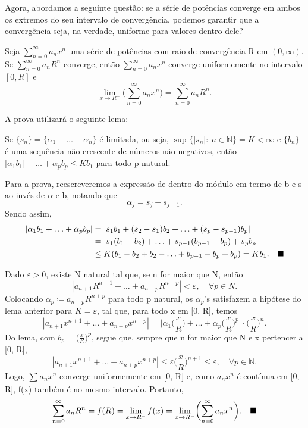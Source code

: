 \documentclass[../analysis_notes.tex]{subfiles}
\begin{document}
Agora, abordamos a seguinte questão: se a série de potências converge em ambos os extremos do seu intervalo de convergência, podemos garantir que a convergência seja, na verdade, uniforme para valores dentro dele?
\hypertarget{abel}{
	\begin{theorem*}[Abel]
		Seja \(\sum\limits_{n=0}^{\infty}a_{n}x^{n}\) uma série de potências com raio de convergência R em \((0, \infty)\). Se \(\sum\limits_{n=0}^{\infty}a_{n}R^{n}\) converge, então \(\sum\limits_{n=0}^{\infty}a_{n}x^{n}\) converge uniformemente no intervalo \([0, R]\) e
		\[
			\lim_{x\to R^{-}}\biggl(\sum\limits_{n=0}^{\infty}a_{n}x^{n}\biggr)=\sum\limits_{n=0}^{\infty}a_{n}R^{n}.
		\]
	\end{theorem*}
}
A prova utilizará o seguinte lema:
\begin{lemma*}
	Se \(\{s_{n}\}=\{\alpha_{1}+\dotsc +\alpha_{n}\}\) é limitada, ou seja, \(\sup_{}\{|s_{n}|: \: n\in \mathbb{N}\}=K<\infty\) e \(\{b_{n}\}\) é uma sequência não-crescente de números não negativos, então \(|\alpha_{1}b_{1}|+\dotsc +\alpha_{p}b_{p}\leq Kb_{1}\) para todo p natural.
\end{lemma*}
\begin{proof*}
	Para a prova, reescreveremos a expressão de dentro do módulo em termo de b e s ao invés de \(\alpha \) e b, notando que
	\[
		\alpha_{j}=s_{j}-s_{j-1}.
	\]
	Sendo assim,
	\begin{align*}
		|\alpha_{1}b_{1}+\dotsc +\alpha_{p}b_{p}| & =|s_{1}b_{1}+(s_{2}-s_{1})b_{2}+\dotsc +(s_{p}-s_{p-1})b_{p}|                        \\
		                                          & =|s_{1}(b_{1}-b_{2})+\dotsc +s_{p-1}(b_{p-1}-b_{p})+s_{p}b_{p}|                      \\
		                                          & \leq K(b_{1}-b_{2}+b_{2}-\dotsc +b_{p-1}-b_{p}+b_{p})=Kb_{1}.\quad \text{$\blacksquare$}
	\end{align*}
\end{proof*}
\begin{proof*}
	Dado \(\varepsilon >0\), existe N natural tal que, se n for maior que N, então
	\[
		|a_{n+1}R^{n+1}+\dotsc +a_{n+p}R^{n+p}|<\varepsilon ,\quad \forall p\in N.
	\]
	Colocando \(\alpha_{p}\coloneqq a_{n+p}R^{n+p}\) para todo p natural, os \(\alpha_{p}\)'s satisfazem a hipótese do lema anterior para \(K=\varepsilon \), tal que, para todo x em [0, R], temos
	\[
		|a_{n+1}x^{n+1}+\dotsc +a_{n+p}x^{n+p}| = \biggl\vert \alpha_{1}\biggl(\frac{x}{R}\biggr)+\dotsc +\alpha_{p}\biggl(\frac{x}{R}\biggr)^{p} \biggr\vert \cdot \biggl(\frac{x}{R}\biggr)^{n}.
	\]
	Do lema, com \(b_{p}=\bigl(\frac{x}{R}\bigr)^{p}\), segue que, sempre que n for maior que N e x pertencer a [0, R],
	\[
		|a_{n+1}x^{n+1}+\dotsc +a_{n+p}x^{n+p}|\leq \varepsilon \biggl(\frac{x}{R}\biggr)^{n+1}\leq \varepsilon,\quad \forall p\in \mathbb{N}.
	\]
	Logo, \(\sum\limits_{}^{}a_{n}x^{n}\) converge uniformemente em [0, R] e, como \(a_{n}x^{n}\) é contínua em [0, R], f(x) também é no mesmo intervalo. Portanto,
	\[
		\sum\limits_{n=0}^{\infty}a_{n}R^{n}=f(R)=\lim_{x\to R^{-}}f(x)=\lim_{x\to R^{-}}\biggl(\sum\limits_{n=0}^{\infty}a_{n}x^{n}\biggr).\quad \text{$\blacksquare$}
	\]
\end{proof*}
\end{document}
